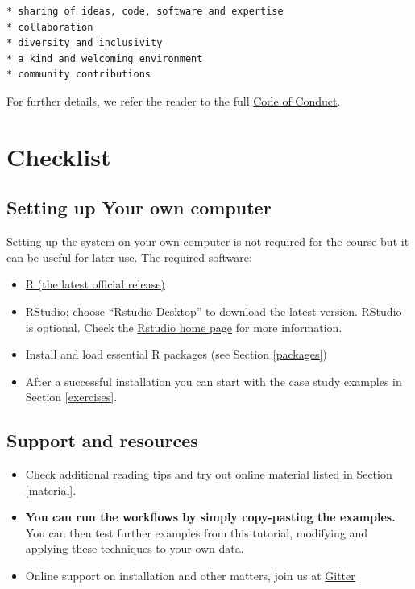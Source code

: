 \documentclass[
]{book}
\begin{document}
\begin{verbatim}
* sharing of ideas, code, software and expertise
* collaboration
* diversity and inclusivity
* a kind and welcoming environment
* community contributions
\end{verbatim}

For further details, we refer the reader to the full \href{https://bioconductor.github.io/bioc_coc_multilingual/}{Code of Conduct}.

\hypertarget{checklist}{%
\section{Checklist}\label{checklist}}

\hypertarget{setting-up-your-own-computer}{%
\subsection{Setting up Your own computer}\label{setting-up-your-own-computer}}

Setting up the system on your own computer is not required for the
course but it can be useful for later use. The required software:

\begin{itemize}
\item
  \href{https://www.r-project.org/}{R (the latest official release)}
\item
  \href{https://www.rstudio.com/products/rstudio/download/}{RStudio};
  choose ``Rstudio Desktop'' to download the latest version. RStudio is
  optional. Check the \href{https://www.rstudio.com/}{Rstudio home page}
  for more information.
\item
  Install and load essential R packages (see Section \ref{packages})
\item
  After a successful installation you can start with the
  case study examples in Section \ref{exercises}.
\end{itemize}

\hypertarget{support-and-resources}{%
\subsection{Support and resources}\label{support-and-resources}}

\begin{itemize}
\item
  Check additional reading tips and try out online material listed in
  Section \ref{material}.
\item
  \textbf{You can run the workflows by simply copy-pasting the examples.}
  You can then test further examples from this tutorial, modifying and
  applying these techniques to your own data.
\item
  Online support on installation and other matters, join us at
  \href{https://gitter.im/microbiome/miaverse?utm_source=badge\&utm_medium=badge\&utm_campaign=pr-badge\&utm_content=badge}{Gitter}
\end{itemize}
\end{document}
